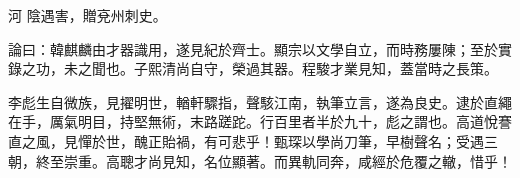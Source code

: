 \begin{pinyinscope}
 河
 陰遇害，贈兗州刺史。



 論曰：韓麒麟由才器識用，遂見紀於齊士。顯宗以文學自立，而時務屢陳；至於實錄之功，未之聞也。子熙清尚自守，榮過其器。程駿才業見知，蓋當時之長策。



 李彪生自微族，見擢明世，輶軒驟指，聲駭江南，執筆立言，遂為良史。逮於直繩在手，厲氣明目，持堅無術，末路蹉跎。行百里者半於九十，彪之謂也。高道悅謇直之風，見憚於世，醜正貽禍，有可悲乎！甄琛以學尚刀筆，早樹聲名；受遇三朝，終至崇重。高聰才尚見知，名位顯著。而異軌同奔，咸經於危覆之轍，惜乎！



\end{pinyinscope}